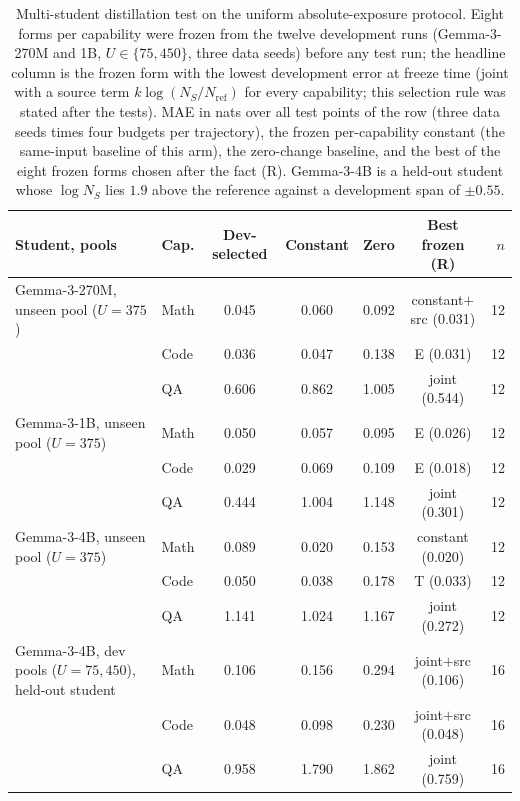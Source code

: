 \begin{table}[H]
\centering\small
\caption{Multi-student distillation test on the uniform absolute-exposure protocol. Eight forms per capability were frozen from the twelve development runs (Gemma-3-270M and 1B, $U\in\{75,450\}$, three data seeds) before any test run; the headline column is the frozen form with the lowest development error at freeze time (joint with a source term $k\log(N_S/N_{\mathrm{ref}})$ for every capability; this selection rule was stated after the tests). MAE in nats over all test points of the row (three data seeds times four budgets per trajectory), the frozen per-capability constant (the same-input baseline of this arm), the zero-change baseline, and the best of the eight frozen forms chosen after the fact (R). Gemma-3-4B is a held-out student whose $\log N_S$ lies $1.9$ above the reference against a development span of $\pm0.55$.}
\label{tab:p2v2_test}
\begin{tabular}{llccccr}
\toprule
Student, pools & Cap. & Dev-selected & Constant & Zero & Best frozen (R) & $n$ \\
\midrule
Gemma-3-270M, unseen pool ($U{=}375$) & Math & 0.045 & 0.060 & 0.092 & constant$+$src (0.031) & 12 \\
 & Code & 0.036 & 0.047 & 0.138 & E (0.031) & 12 \\
 & QA & 0.606 & 0.862 & 1.005 & joint (0.544) & 12 \\
\addlinespace
Gemma-3-1B, unseen pool ($U{=}375$) & Math & 0.050 & 0.057 & 0.095 & E (0.026) & 12 \\
 & Code & 0.029 & 0.069 & 0.109 & E (0.018) & 12 \\
 & QA & 0.444 & 1.004 & 1.148 & joint (0.301) & 12 \\
\addlinespace
Gemma-3-4B, unseen pool ($U{=}375$) & Math & 0.089 & 0.020 & 0.153 & constant (0.020) & 12 \\
 & Code & 0.050 & 0.038 & 0.178 & T (0.033) & 12 \\
 & QA & 1.141 & 1.024 & 1.167 & joint (0.272) & 12 \\
\addlinespace
Gemma-3-4B, dev pools ($U{=}75,450$), held-out student & Math & 0.106 & 0.156 & 0.294 & joint$+$src (0.106) & 16 \\
 & Code & 0.048 & 0.098 & 0.230 & joint$+$src (0.048) & 16 \\
 & QA & 0.958 & 1.790 & 1.862 & joint (0.759) & 16 \\
\bottomrule
\end{tabular}
\end{table}
